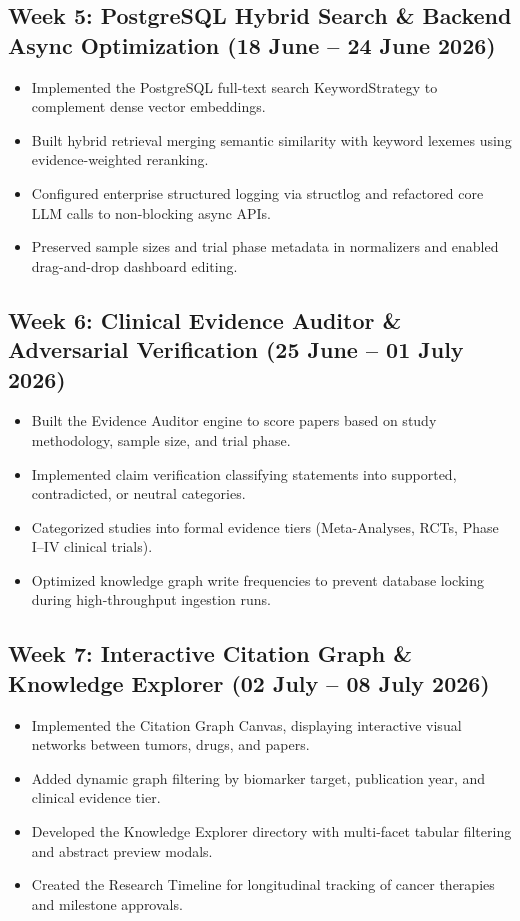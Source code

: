 \documentclass[11pt,a4paper]{article}
\begin{document}
\subsection*{Week 5: PostgreSQL Hybrid Search \& Backend Async Optimization (18 June -- 24 June 2026)}
\begin{itemize}[leftmargin=*,noitemsep]
    \item Implemented the PostgreSQL full-text search KeywordStrategy to complement dense vector embeddings.
    \item Built hybrid retrieval merging semantic similarity with keyword lexemes using evidence-weighted reranking.
    \item Configured enterprise structured logging via structlog and refactored core LLM calls to non-blocking async APIs.
    \item Preserved sample sizes and trial phase metadata in normalizers and enabled drag-and-drop dashboard editing.
\end{itemize}

\subsection*{Week 6: Clinical Evidence Auditor \& Adversarial Verification (25 June -- 01 July 2026)}
\begin{itemize}[leftmargin=*,noitemsep]
    \item Built the Evidence Auditor engine to score papers based on study methodology, sample size, and trial phase.
    \item Implemented claim verification classifying statements into supported, contradicted, or neutral categories.
    \item Categorized studies into formal evidence tiers (Meta-Analyses, RCTs, Phase I--IV clinical trials).
    \item Optimized knowledge graph write frequencies to prevent database locking during high-throughput ingestion runs.
\end{itemize}

\subsection*{Week 7: Interactive Citation Graph \& Knowledge Explorer (02 July -- 08 July 2026)}
\begin{itemize}[leftmargin=*,noitemsep]
    \item Implemented the Citation Graph Canvas, displaying interactive visual networks between tumors, drugs, and papers.
    \item Added dynamic graph filtering by biomarker target, publication year, and clinical evidence tier.
    \item Developed the Knowledge Explorer directory with multi-facet tabular filtering and abstract preview modals.
    \item Created the Research Timeline for longitudinal tracking of cancer therapies and milestone approvals.
\end{itemize}
\end{document}
